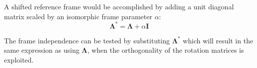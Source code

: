 \documentclass[a4paper,10pt,twoside,openany]{article}
\begin{document}
A shifted reference frame would be accomplished by adding a unit diagonal matrix scaled by an isomorphic frame parameter $\alpha$:
\begin{equation}
\boldsymbol{\Lambda}^{*}=\boldsymbol{\Lambda}+\alpha\boldsymbol{I}
\end{equation}

The frame independence can be tested by substituting $\boldsymbol{\Lambda}^{*}$ which will result in the same expression as using $\boldsymbol{\Lambda}$, when the orthogonality of the rotation matrices is exploited.


%
%
\end{document}
